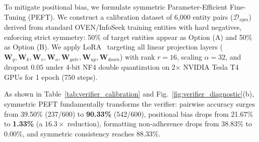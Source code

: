 \documentclass[conference]{IEEEtran}
\begin{document}
\begin{table}[!htbp]
\caption{Verifier Calibration Benchmark: Zero-Shot Foundation VLM vs. Calibrated Symmetric LoRA Verifier on Held-Out Symmetric Validation Benchmark ($N=600$ Pairs)}
\label{tab:verifier_calibration}
\centering
{}
\end{table}

To mitigate positional bias, we formulate symmetric Parameter-Efficient Fine-Tuning (PEFT). We construct a calibration dataset of 6,000 entity pairs ($\mathcal{D}_{sym}$) derived from standard OVEN/InfoSeek training entities with hard negatives, enforcing strict symmetry: 50\% of target entities appear as Option (A) and 50\% as Option (B). We apply LoRA~\cite{lora} targeting all linear projection layers ($\mathbf{W}_q, \mathbf{W}_k, \mathbf{W}_v, \mathbf{W}_o, \mathbf{W}_{gate}, \mathbf{W}_{up}, \mathbf{W}_{down}$) with rank $r=16$, scaling $\alpha=32$, and dropout $0.05$ under 4-bit NF4 double quantization on 2$\times$ NVIDIA Tesla T4 GPUs for 1 epoch (750 steps).

As shown in Table~\ref{tab:verifier_calibration} and Fig.~\ref{fig:verifier_diagnostic}(b), symmetric PEFT fundamentally transforms the verifier: pairwise accuracy surges from 39.50\% (237/600) to \textbf{90.33\%} (542/600), positional bias drops from 21.67\% to \textbf{1.33\%} (a $16.3\times$ reduction), formatting non-adherence drops from 38.83\% to 0.00\%, and symmetric consistency reaches 88.33\%.
\end{document}
